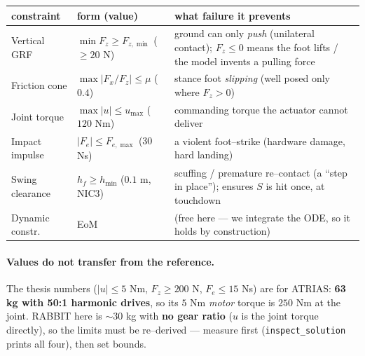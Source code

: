\documentclass[11pt,a4paper]{article}
\newcommand{\fname}[1]{\texttt{#1}}          %
\begin{document}
\begin{center}
\begin{tabular}{@{}llp{5.4cm}@{}}
\toprule
constraint & form (value) & what failure it prevents \\
\midrule
Vertical GRF   & $\min F_z \ge F_{z,\min}$ ($\ge 20$ N) &
  ground can only \emph{push} (unilateral contact); $F_z\!\le\!0$ means the foot lifts / the model invents a pulling force \\
Friction cone  & $\max|F_x/F_z| \le \mu$ ($0.4$) &
  stance foot \emph{slipping} (well posed only where $F_z>0$) \\
Joint torque   & $\max|u| \le u_{\max}$ ($120$ Nm) &
  commanding torque the actuator cannot deliver \\
Impact impulse & $|F_e| \le F_{e,\max}$ ($30$ Ns) &
  a violent foot--strike (hardware damage, hard landing) \\
Swing clearance& $h_f \ge h_{\min}$ ($0.1$ m, NIC3) &
  scuffing / premature re--contact (a ``step in place''); ensures $S$ is hit once, at touchdown \\
Dynamic constr.& EoM &
  (free here --- we integrate the ODE, so it holds by construction) \\
\bottomrule
\end{tabular}
\end{center}

\paragraph{Values do not transfer from the reference.} The thesis numbers
($|u|\le 5$ Nm, $F_z\ge 200$ N, $F_e\le 15$ Ns) are for ATRIAS: \textbf{63 kg
with 50:1 harmonic drives}, so its $5$ Nm \emph{motor} torque is $250$ Nm at the
joint. RABBIT here is $\sim$30 kg with \textbf{no gear ratio} ($u$ is the joint
torque directly), so the limits must be re--derived --- measure first
(\fname{inspect\_solution} prints all four), then set bounds.
\end{document}

